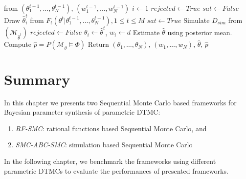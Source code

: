 \begin{algorithm}[H]
\begin{algorithmic}[1]
        \hspace{3cm} from $(\theta^{t-1}_1,\ldots,\theta^{t-1}_N)$, $(w^{t-1}_1,\ldots,w^{t-1}_N)$  
        \State $i \leftarrow 1$
         
        \State $rejected \leftarrow True$
        \State $sat \leftarrow False $
        \State Draw $\hat{\theta}^t_i$ from $F_t(\theta^t | \theta^{t-1}_1,\ldots,\theta^{t-1}_N), 1\leq t \leq M$
        \State $sat \leftarrow True$
        \EndIf
        \EndWhile
        \State Simulate $D_{sim}$ from $(\mathcal{M}_{\hat{\theta}^t})$
        \State $rejected \leftarrow False$
        \State $\theta_i \leftarrow \hat{\theta}^t$, $w_i \leftarrow d$
        \EndIf
        \EndWhile
        \EndWhile
        \EndWhile
        \State Estimate $\hat{\theta}$ using posterior mean.
        \State Compute $\hat{p}=P(\mathcal{M}_{\hat{\theta}}\models\Phi)$
        \State Return $(\theta_1,\ldots,\theta_{N})$, $(w_1,\ldots,w_{N})$, $\hat{\theta}$, $\hat{p}$
        \EndProcedure
    \end{algorithmic}
\end{algorithm}

\section{Summary}
In this chapter we presents two Sequential Monte Carlo based frameworks for Bayesian parameter
synthesis of parametric DTMC:
\begin{enumerate}
    \item \textit{RF-SMC}: rational functions based Sequential Monte Carlo, and
    \item \textit{SMC-ABC-SMC}: simulation based Sequential Monte Carlo
\end{enumerate}
In the following chapter, we benchmark the frameworks using different parametric DTMCs to evaluate
the performances of presented frameworks.